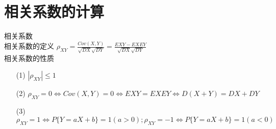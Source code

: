 \documentclass[12pt, a4paper, oneside, UTF8]{ctexbook}
\begin{document}
\section{相关系数的计算}
\begin{remark}
    相关系数 \\
    相关系数的定义 $\rho_{XY}=\frac{Cov(X,Y)}{\sqrt{DX}\sqrt{DY}}=\frac{EXY-EXEY}{\sqrt{DX}\sqrt{DY}}$ \\
    相关系数的性质 
    \begin{enumerate}
    \item[(1)] $\left|\rho_{XY}\right|\leq 1$
    \item[(2)] $\rho_{XY}=0\iff Cov(X,Y)=0 \iff EXY=EXEY \iff D(X+Y)=DX+DY$
    \item[(3)] $\rho_{XY}=1\iff P\{Y=aX+b\}=1(a>0);\rho_{XY}=-1\iff P\{Y=aX+b\}=1(a<0)$  
    \end{enumerate}
\end{remark}
\end{document}
